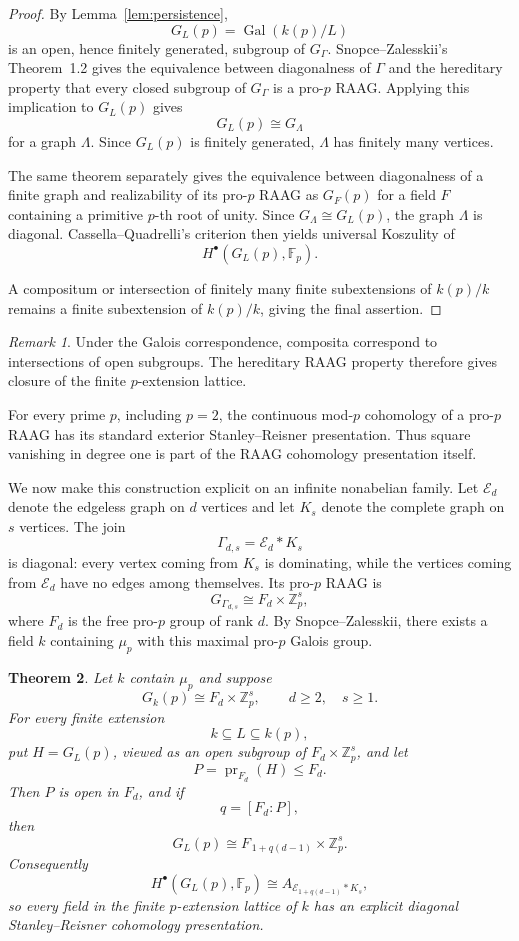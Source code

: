 \documentclass[12pt]{amsart}
\theoremstyle{plain}
\newtheorem{theorem}{Theorem}[section]
\theoremstyle{definition}
\theoremstyle{remark}
\newtheorem{remark}[theorem]{Remark}
\numberwithin{equation}{section}
\newcommand{\Fp}{\mathbb{F}_p}
\begin{document}
\begin{proof}
By Lemma~\ref{lem:persistence},
\[
G_L(p)=\operatorname{Gal}(k(p)/L)
\]
is an open, hence finitely generated, subgroup of \(G_\Gamma\).
Snopce--Zalesskii's Theorem~1.2 gives the equivalence between diagonalness
of \(\Gamma\) and the hereditary property that every closed subgroup of
\(G_\Gamma\) is a pro-\(p\) RAAG. Applying this implication to \(G_L(p)\)
gives
\[
G_L(p)\cong G_\Lambda
\]
for a graph \(\Lambda\). Since \(G_L(p)\) is finitely generated,
\(\Lambda\) has finitely many vertices.

The same theorem separately gives the equivalence between diagonalness of a
finite graph and realizability of its pro-\(p\) RAAG as \(G_F(p)\) for a
field \(F\) containing a primitive \(p\)-th root of unity. Since
\(G_\Lambda\cong G_L(p)\), the graph \(\Lambda\) is diagonal.
Cassella--Quadrelli's criterion then yields universal Koszulity of
\[
H^\bullet(G_L(p),\Fp).
\]

A compositum or intersection of finitely many finite subextensions of
\(k(p)/k\) remains a finite subextension of \(k(p)/k\), giving the final
assertion.
\end{proof}

\begin{remark}
Under the Galois correspondence, composita correspond to intersections of
open subgroups. The hereditary RAAG property therefore gives closure of the
finite \(p\)-extension lattice.
\end{remark}

For every prime \(p\), including \(p=2\), the continuous mod-\(p\)
cohomology of a pro-\(p\) RAAG has its standard exterior
Stanley--Reisner presentation. Thus square vanishing in degree one is part
of the RAAG cohomology presentation itself.

We now make this construction explicit on an infinite nonabelian
family. Let \(\mathcal E_d\) denote the edgeless graph on \(d\)
vertices and let \(K_s\) denote the complete graph on \(s\) vertices.
The join
\[
\Gamma_{d,s}=\mathcal E_d\ast K_s
\]
is diagonal: every vertex coming from \(K_s\) is dominating, while the
vertices coming from \(\mathcal E_d\) have no edges among themselves.
Its pro-\(p\) RAAG is
\[
G_{\Gamma_{d,s}}\cong F_d\times \mathbb Z_p^s,
\]
where \(F_d\) is the free pro-\(p\) group of rank \(d\).
By Snopce--Zalesskii, there exists a field \(k\) containing \(\mu_p\)
with this maximal pro-\(p\) Galois group.

\begin{theorem}
\label{thm:split-raag-lattice}
Let \(k\) contain \(\mu_p\) and suppose
\[
G_k(p)\cong F_d\times\mathbb Z_p^s,
\qquad d\ge2,\quad s\ge1.
\]
For every finite extension
\[
k\subseteq L\subseteq k(p),
\]
put \(H=G_L(p)\), viewed as an open subgroup of
\(F_d\times\mathbb Z_p^s\), and let
\[
P=\operatorname{pr}_{F_d}(H)\le F_d.
\]
Then \(P\) is open in \(F_d\), and if
\[
q=[F_d:P],
\]
then
\[
G_L(p)\cong F_{\,1+q(d-1)}\times\mathbb Z_p^s.
\]
Consequently
\[
H^\bullet(G_L(p),\Fp)
\cong
A_{\mathcal E_{1+q(d-1)}\ast K_s},
\]
so every field in the finite \(p\)-extension lattice of \(k\) has an
explicit diagonal Stanley--Reisner cohomology presentation.
\end{theorem}
\end{document}
